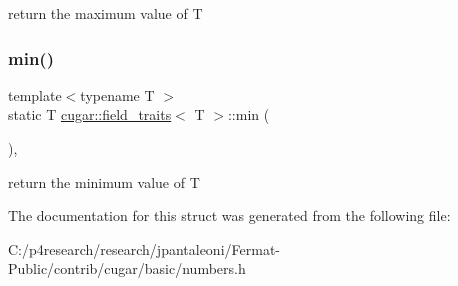 return the maximum value of T \mbox{\label{structcugar_1_1field__traits_ad4b1179d58dbf86897d4c9a7d9b53f6d}} 
\subsubsection{\texorpdfstring{min()}{min()}}
{\footnotesize\ttfamily template$<$typename T $>$ \\
static T \hyperlink{structcugar_1_1field__traits}{cugar\+::field\+\_\+traits}$<$ T $>$\+::min (\begin{DoxyParamCaption}{ }\end{DoxyParamCaption})\hspace{0.3cm}{\ttfamily [inline]}, {\ttfamily [static]}}

return the minimum value of T 

The documentation for this struct was generated from the following file\+:\begin{DoxyCompactItemize}
\item 
C\+:/p4research/research/jpantaleoni/\+Fermat-\/\+Public/contrib/cugar/basic/numbers.\+h\end{DoxyCompactItemize}
